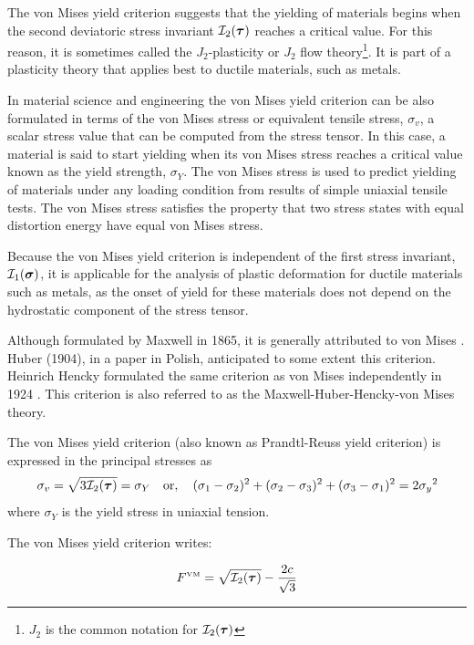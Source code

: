 The von Mises yield criterion suggests that the yielding of materials begins when the second 
deviatoric stress invariant ${\cal I}_2({\bm \tau})$ reaches a critical value. 
For this reason, it is sometimes called the $J_2$-plasticity or $J_2$ flow 
theory\footnote{$J_2$ is the common notation for ${\cal I}_2({\bm \tau})$}. 
It is part of a plasticity theory that applies best to ductile materials, such as metals. 

In material science and engineering the von Mises yield criterion can be also formulated in terms of 
the von Mises stress or equivalent tensile stress, $\sigma_v$, a scalar stress value that can be computed 
from the stress tensor. In this case, a material is said to start yielding when its von Mises stress 
reaches a critical value known as the yield strength, $\sigma_Y$. The von Mises stress is used to predict 
yielding of materials under any loading condition from results of simple uniaxial tensile tests. The 
von Mises stress satisfies the property that two stress states with equal distortion energy have equal 
von Mises stress. 

Because the von Mises yield criterion is independent of the first stress invariant, ${\cal I}_1({\bm \sigma})$, 
it is applicable 
for the analysis of plastic deformation for ductile materials such as metals, as the onset of yield for these materials does not depend on the hydrostatic component of the stress tensor. 

Although formulated by Maxwell in 1865, it is generally attributed to von Mises \cite{vonm13}. 
Huber (1904), in a paper in Polish, anticipated to some extent this criterion. 
Heinrich Hencky formulated the same criterion as von Mises independently in 1924 \cite{henc24,tata03}.
This criterion is also referred to as the Maxwell-Huber-Hencky-von Mises theory. 

The von Mises yield criterion (also known as Prandtl-Reuss yield criterion) is expressed in the principal stresses as
\[
\sigma_v=\sqrt{3 {\cal I}_2({\bm \tau}) } = \sigma_Y \quad \text{or}, \quad {(\sigma_1 - \sigma_2)^2 + (\sigma_2 - \sigma_3)^2 + (\sigma_3 - \sigma_1)^2 = 2 {\sigma_y}^2 }\!
\]
where $\sigma_Y$ is the yield stress in uniaxial tension.

The von Mises yield criterion writes:

\begin{mdframed}[backgroundcolor=blue!5]
\begin{equation}
F^{\text{\tiny VM}}= \sqrt{ {\cal I}_2({\bm \tau})  } - \frac{2c}{\sqrt{3}}  \label{vmcrit}
\end{equation}
\end{mdframed}

